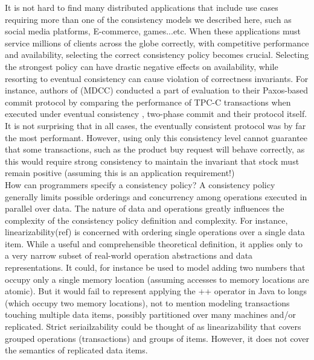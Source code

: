 It is not hard to find many distributed applications that include use cases
requiring more than one of the consistency models we described here, such as social media
platforms, E-commerce, games...etc. When these applications must service millions of
clients across the globe correctly, with competitive performance and
availability, selecting the correct consistency policy becomes crucial.
Selecting the strongest policy can have drastic negative effects on availability, while
resorting to eventual consistency can cause violation of correctness invariants.
For instance, authors of (MDCC) conducted a part of evaluation to their Paxos-based commit
protocol by comparing the performance of TPC-C transactions when executed under eventual consistency  
, two-phase commit  and their protocol itself. It is not surprising that in all cases, the eventually
consistent protocol was by far the most
performant. However, using only this consistency level cannot guarantee that
some transactions, such as the product buy request will behave correctly, as
this would require strong consistency to maintain the invariant that stock must
remain positive (assuming this is an application requirement!) \\

How can programmers specify a consistency policy? 
A consistency policy generally limits possible orderings and concurrency among
operations executed in parallel over data. The nature of data and operations
greatly influences the complexity of the consistency policy definition and
complexity. For instance, linearizability(ref) is concerned with ordering single
operations over a single data item. While a useful and comprehensible theoretical
definition, it applies only to a very narrow subset of real-world operation
abstractions and data representations. It could, for instance be used to model adding
two numbers that occupy only a single memory location (assuming accesses to
memory locations are atomic). But it would fail to represent applying the ++
operator in Java to longs (which occupy two memory locations), not to mention
modeling transactions touching multiple data items, possibly partitioned over many
machines and/or replicated. Strict seriailzability could be thought of as
linearizability that covers grouped operations (transactions) and groups of
items. However, it does not cover the semantics of replicated data items.\\

